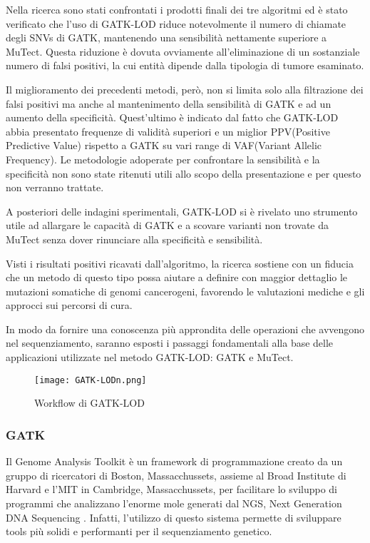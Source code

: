 Nella ricerca sono stati confrontati i prodotti finali dei tre algoritmi ed è stato verificato che l'uso di GATK-LOD riduce notevolmente il numero di chiamate degli SNVs di GATK, mantenendo una sensibilità nettamente superiore a MuTect.
Questa riduzione è dovuta ovviamente all'eliminazione di un sostanziale numero di falsi positivi, la cui entità dipende dalla tipologia di tumore esaminato.

Il miglioramento dei precedenti metodi, però, non si limita solo alla filtrazione dei falsi positivi ma anche al mantenimento della sensibilità di GATK e ad un aumento della specificità.
Quest'ultimo è indicato dal fatto che GATK-LOD abbia presentato frequenze di validità superiori e un miglior PPV(Positive Predictive Value) rispetto a GATK su vari range di VAF(Variant Allelic Frequency).
Le metodologie adoperate per confrontare la sensibilità e la specificità non sono state ritenuti utili allo scopo della presentazione e per questo non verranno trattate.

A posteriori delle indagini sperimentali, GATK-LOD si è rivelato uno strumento utile ad allargare le capacità di GATK e a scovare varianti non trovate da MuTect senza dover rinunciare alla specificità e sensibilità.

Visti i risultati positivi ricavati dall'algoritmo, la ricerca sostiene con un fiducia che un metodo di questo tipo possa aiutare a definire con maggior dettaglio le mutazioni somatiche di genomi cancerogeni, favorendo le valutazioni mediche e gli approcci sui percorsi di cura.

In modo da fornire una conoscenza più approndita delle operazioni che avvengono nel sequenziamento, saranno esposti %
i passaggi fondamentali alla base delle applicazioni utilizzate nel metodo GATK-LOD: GATK e MuTect.
\begin{figure}[H]
\centering
\texttt{[image: GATK-LODn.png]}
\caption{Workflow di GATK-LOD}
\label{fig: GATK-LODn}
\end{figure}


\subsubsection{GATK}
Il Genome Analysis Toolkit è un framework di programmazione creato da un gruppo di ricercatori di Boston, Massacchussets, assieme al Broad Institute di Harvard e l'MIT in Cambridge, Massacchussets, per facilitare lo sviluppo di programmi che analizzano l'enorme mole generati dal NGS, Next Generation DNA Sequencing \cite{McKenna2010}.
Infatti, l'utilizzo di questo sistema permette di sviluppare tools più solidi e performanti per il sequenziamento genetico.

